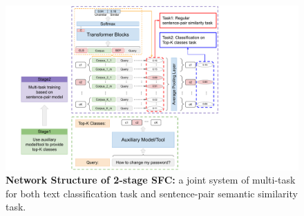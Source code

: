 \documentclass[letterpaper]{article} %
\begin{document}
  \begin{figure}[htbp]
    \begin{centering}
      \includegraphics[scale=0.48]{picture/picture3}
      \par
    \end{centering}
    \caption{
      \textbf{Network  Structure  of  2-stage SFC:} a joint system of multi-task
      for  both  text  classification task and sentence-pair semantic similarity
      task.
    }
    \label{fig:ver.1.3}
  \end{figure}
\end{document}
